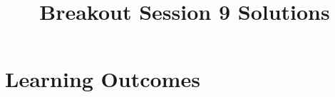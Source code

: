 \documentclass[nooutcomes]{ximera}
\title{Breakout Session 9 Solutions}
\begin{document}
\begin{abstract}


\end{abstract}
\maketitle

\section{Learning Outcomes}



\end{document}
